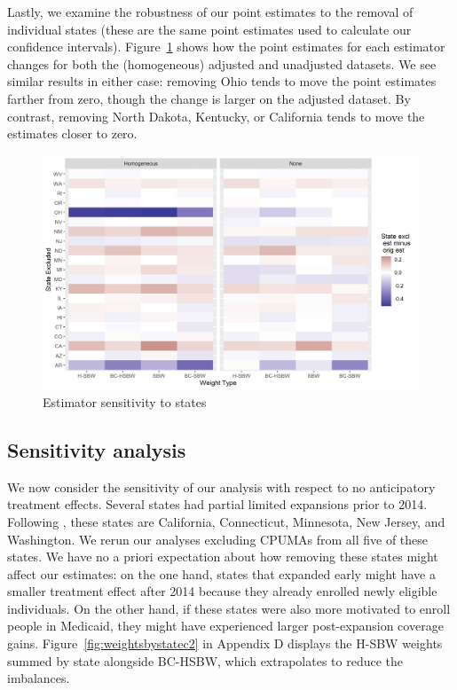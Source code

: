 \documentclass[article]{imsart}
\theoremstyle{plain}
\theoremstyle{remark}
\begin{document}
Lastly, we examine the robustness of our point estimates to the removal of individual states (these are the same point estimates used to calculate our confidence intervals). Figure~\ref{fig:loostateplot} shows how the point estimates for each estimator changes for both the (homogeneous) adjusted and unadjusted datasets. We see similar results in either case: removing Ohio tends to move the point estimates farther from zero, though the change is larger on the adjusted dataset. By contrast, removing North Dakota, Kentucky, or California tends to move the estimates closer to zero. 

\begin{figure}[H]
\begin{center}
    \caption{Estimator sensitivity to states}
    \label{fig:loostateplot}
    \includegraphics[scale=0.6]{01_Plots/loostate-sensitivityc1-state-uu-i.png}
\end{center}
\end{figure}

\subsection{Sensitivity analysis} \label{sssec:sensitivity}

We now consider the sensitivity of our analysis with respect to no anticipatory treatment effects. Several states had partial limited expansions prior to 2014. Following \cite{frean2017premium}, these states are California, Connecticut, Minnesota, New Jersey, and Washington. We rerun our analyses excluding CPUMAs from all five of these states. We have no a priori expectation about how removing these states might affect our estimates: on the one hand, states that expanded early might have a smaller treatment effect after 2014 because they already enrolled newly eligible individuals. On the other hand, if these states were also more motivated to enroll people in Medicaid, they might have experienced larger post-expansion coverage gains. Figure~\ref{fig:weightsbystatec2} in Appendix D displays the H-SBW weights summed by state alongside BC-HSBW, which extrapolates to reduce the imbalances. 
\end{document}

